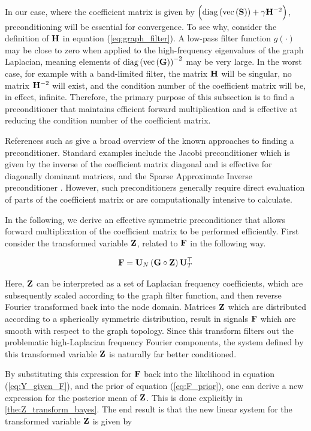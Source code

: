 In our case, where the coefficient matrix is given by $\Big(\text{\textup{diag}}\left(\text{\textup{vec}}\left(\mathbf{S}\right)\right) + \gamma  \mathbf{H}^{-2}\Big)$, preconditioning will be essential for convergence. To see why, consider the definition of $\mathbf{H}$ in equation (\ref{eq:graph_filter}). A low-pass filter function $g(\cdot)$ may be close to zero when applied to the high-frequency eigenvalues of the graph Laplacian, meaning elements of $\text{\textup{diag}}\left(\text{\textup{vec}}\left(\mathbf{G}\right)\right)^{-2}$ may be very large. In the worst case, for example with a band-limited filter, the matrix $\mathbf{H}$ will be singular, no matrix $\mathbf{H}^{-2}$ will exist, and the condition number of the coefficient matrix will be, in effect, infinite. Therefore, the primary purpose of this subsection is to find a preconditioner that maintains efficient forward multiplication and is effective at reducing the condition number of the coefficient matrix.

References such as \citep{Saad2003} give a broad overview of the known approaches to finding a preconditioner. Standard examples include the Jacobi preconditioner which is given by the inverse of the coefficient matrix diagonal and is effective for diagonally dominant matrices, and the Sparse Approximate Inverse preconditioner \citep{Grote1997}. However, such preconditioners generally require direct evaluation of parts of the coefficient matrix or are computationally intensive to calculate.

In the following, we derive an effective symmetric preconditioner that allows forward multiplication of the coefficient matrix to be performed efficiently. First consider the transformed variable $\mathbf{Z}$, related to $\mathbf{F}$ in the following way.

\begin{equation}
    \label{eq:Z_transform}
    \mathbf{F} = \mathbf{U}_N \, (\mathbf{G} \circ \mathbf{Z}) \, \mathbf{U}_T^\top
\end{equation}

Here, $\mathbf{Z}$ can be interpreted as a set of Laplacian frequency coefficients, which are subsequently scaled according to the graph filter function, and then reverse Fourier transformed back into the node domain. Matrices $\mathbf{Z}$ which are distributed according to a spherically symmetric distribution, result in signals $\mathbf{F}$ which are smooth with respect to the graph topology. Since this transform filters out the problematic high-Laplacian frequency Fourier components, the system defined by this transformed variable $\mathbf{Z}$ is naturally far better conditioned.

By substituting this expression for $\mathbf{F}$ back into the likelihood in equation (\ref{eq:Y_given_F}), and the prior of equation (\ref{eq:F_prior}), one can derive a new expression for the posterior mean of $\mathbf{Z}$. This is done explicitly in \cref{the:Z_transform_bayes}. The end result is that the new linear system for the transformed variable $\mathbf{Z}$ is given by


